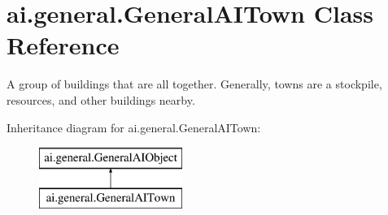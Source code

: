 \hypertarget{classai_1_1general_1_1_general_a_i_town}{
\section{ai.general.GeneralAITown Class Reference}
\label{classai_1_1general_1_1_general_a_i_town}
}


A group of buildings that are all together. Generally, towns are a stockpile, resources, and other buildings nearby.  


Inheritance diagram for ai.general.GeneralAITown:\begin{figure}[H]
\begin{center}
\leavevmode
\includegraphics[height=2.000000cm]{classai_1_1general_1_1_general_a_i_town}
\end{center}
\end{figure}
